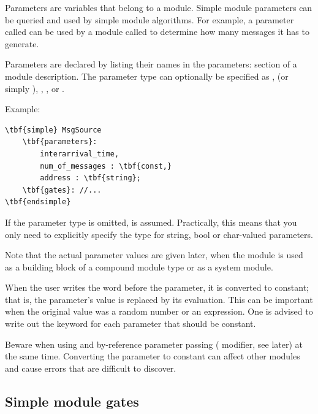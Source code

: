Parameters are variables that belong to a module. Simple module 
parameters can be queried and used by simple module algorithms. 
For example, a parameter called  can be used 
by a module called  to determine how many messages it 
has to generate.


Parameters are declared by listing their names in the
parameters: section of a
module description. The parameter type can optionally be specified as
,  (or simply ),
, , or
.


Example:

\begin{Verbatim}[commandchars=\\\{\}]
\tbf{simple} MsgSource
    \tbf{parameters}:
        interarrival_time, 
        num_of_messages : \tbf{const,}
        address : \tbf{string};
    \tbf{gates}: //...
\tbf{endsimple}
\end{Verbatim}

If the parameter type is omitted, 
is assumed. Practically, this means that you only need to explicitly
specify the type for string, bool or char-valued parameters.

Note that the actual parameter values are given later, when the module
is used as a building block of a compound module type or as a system
module.

When the user writes the word  before
the parameter, it is converted to constant; that is, the parameter's
value is replaced by its evaluation. This can be important when the
original value was a random number or an
expression. One is advised to write out the
 keyword for each parameter that
should be constant.

Beware when using  and by-reference
parameter passing ( modifier, see later)
at the same time. Converting the parameter to constant can affect
other modules and cause errors that are difficult to discover.





\subsection{Simple module gates}
\label{sec:ch-ned-lang:simple-module-gates}

